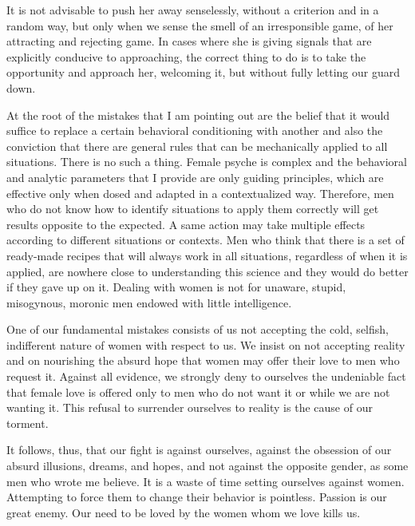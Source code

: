 \par It is not advisable to push her away senselessly, without a criterion and in a random way, but only when we sense the smell of an irresponsible game, of her attracting and rejecting game. In cases where she is giving signals that are explicitly conducive to approaching, the correct thing to do is to take the opportunity and approach her, welcoming it, but without fully letting our guard down.

\par At the root of the mistakes that I am pointing out are the belief that it would suffice to replace a certain behavioral conditioning with another and also the conviction that there are general rules that can be mechanically applied to all situations. There is no such a thing. Female psyche is complex and the behavioral and analytic parameters that I provide are only guiding principles, which are effective only when dosed and adapted in a contextualized way. Therefore, men who do not know how to identify situations to apply them correctly will get results opposite to the expected. A same action may take multiple effects according to different situations or contexts. Men who think that there is a set of ready-made recipes that will always work in all situations, regardless of when it is applied, are nowhere close to understanding this science and they would do better if they gave up on it. Dealing with women is not for unaware, stupid, misogynous, moronic men endowed with little intelligence.

\par One of our fundamental mistakes consists of us not accepting the cold, selfish, indifferent nature of women with respect to us. We insist on not accepting reality and on nourishing the absurd hope that women may offer their love to men who request it. Against all evidence, we strongly deny to ourselves the undeniable fact that female love is offered only to men who do not want it or while we are not wanting it. This refusal to surrender ourselves to reality is the cause of our torment.

\par It follows, thus, that our fight is against ourselves, against the obsession of our absurd illusions, dreams, and hopes, and not against the opposite gender, as some men who wrote me believe. It is a waste of time setting ourselves against women. Attempting to force them to change their behavior is pointless. Passion is our great enemy. Our need to be loved by the women whom we love kills us.\footnotemark[2]

